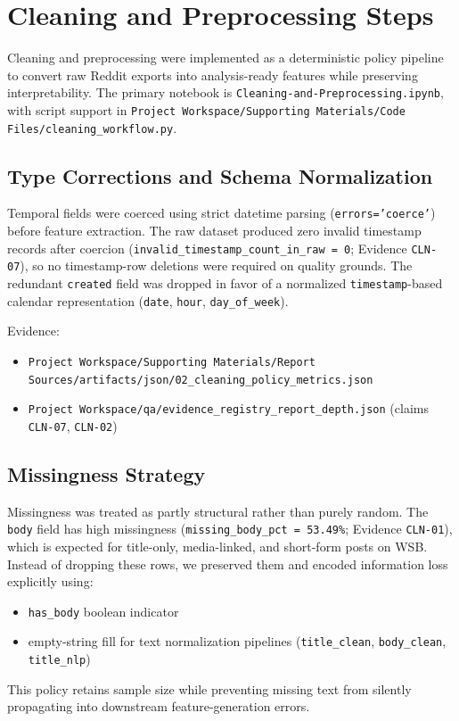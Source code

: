 \section{Cleaning and Preprocessing Steps}

Cleaning and preprocessing were implemented as a deterministic policy pipeline to convert raw Reddit exports into analysis-ready features while preserving interpretability. The primary notebook is \texttt{Cleaning-and-Preprocessing.ipynb}, with script support in \verb|Project Workspace/Supporting Materials/Code Files/cleaning_workflow.py|.

\subsection{Type Corrections and Schema Normalization}
Temporal fields were coerced using strict datetime parsing (\texttt{errors='coerce'}) before feature extraction. The raw dataset produced zero invalid timestamp records after coercion (\texttt{invalid\_timestamp\_count\_in\_raw = 0}; Evidence \texttt{CLN-07}), so no timestamp-row deletions were required on quality grounds. The redundant \texttt{created} field was dropped in favor of a normalized \texttt{timestamp}-based calendar representation (\texttt{date}, \texttt{hour}, \texttt{day\_of\_week}).

Evidence:
\begin{itemize}
  \item \verb|Project Workspace/Supporting Materials/Report Sources/artifacts/json/02_cleaning_policy_metrics.json|
  \item \verb|Project Workspace/qa/evidence_registry_report_depth.json| (claims \texttt{CLN-07}, \texttt{CLN-02})
\end{itemize}

\subsection{Missingness Strategy}
Missingness was treated as partly structural rather than purely random. The \texttt{body} field has high missingness (\texttt{missing\_body\_pct = 53.49\%}; Evidence \texttt{CLN-01}), which is expected for title-only, media-linked, and short-form posts on WSB. Instead of dropping these rows, we preserved them and encoded information loss explicitly using:
\begin{itemize}
  \item \texttt{has\_body} boolean indicator
  \item empty-string fill for text normalization pipelines (\texttt{title\_clean}, \texttt{body\_clean}, \texttt{title\_nlp})
\end{itemize}
This policy retains sample size while preventing missing text from silently propagating into downstream feature-generation errors.

